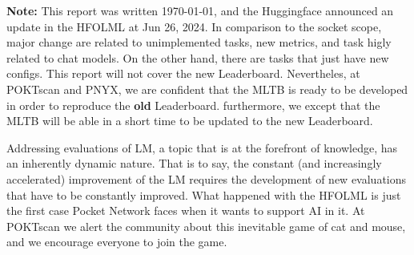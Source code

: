 \begin{tcolorbox}[colback=red!5!white,colframe=red!75!black]
\textbf{Note:} This report was written \today, and the Huggingface announced an update in the \gls{HFOLML} at Jun 26, 2024. 
In comparison to the socket scope, major change are related to unimplemented tasks, new metrics, and task higly related to chat models. 
On the other hand, there are tasks that just have new configs. 
This report will not cover the new Leaderboard. 
Nevertheles, at POKTscan and PNYX, we are confident that the \gls{MLTB} is ready to be developed in order to reproduce the \textbf{old} Leaderboard. 
furthermore, we except that the \gls{MLTB} will be able in a short time to be updated to the new Leaderboard. 

Addressing evaluations of \gls{LM}, a topic that is at the forefront of knowledge, has an inherently dynamic nature. 
That is to say, the constant (and increasingly accelerated) improvement of the \gls{LM} requires the development of new evaluations that have to be constantly improved. 
What happened with the \gls{HFOLML} is just the first case Pocket Network faces when it wants to support AI in it. 
At POKTscan we alert the community about this inevitable game of cat and mouse, and we encourage everyone to join the game. 
\end{tcolorbox}